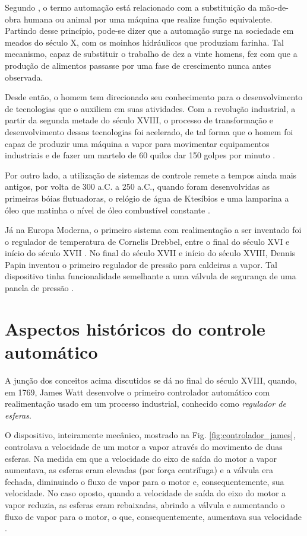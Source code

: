 \label{cap:introducao}

Segundo , o termo automação está relacionado com a
substituição da mão-de-obra humana ou animal por uma máquina que realize função
equivalente. Partindo desse princípio, pode-se dizer que a automação surge na
sociedade em meados do século X, com os moinhos hidráulicos que produziam
farinha. Tal mecanismo, capaz de substituir o trabalho de dez a vinte homens,
fez com que a produção de alimentos passasse por uma fase de crescimento nunca
antes observada.

Desde então, o homem tem direcionado seu conhecimento para o desenvolvimento de
tecnologias que o auxiliem em suas atividades. Com a revolução industrial, a
partir da segunda metade do século XVIII, o processo de transformação e
desenvolvimento dessas tecnologias foi acelerado, de tal forma que o homem foi
capaz de produzir uma máquina a vapor para movimentar equipamentos industriais e
de fazer um martelo de 60 quilos dar 150 golpes por minuto \cite{goeking:2010}.

Por outro lado, a utilização de sistemas de controle remete a tempos ainda mais
antigos, por volta de 300 a.C. a 250 a.C., quando foram desenvolvidas as
primeiras bóias flutuadoras, o relógio de água de Ktesíbios e uma lamparina a
óleo que matinha o nível de óleo combustível constante
\cite{mayr:1970,mayr:1971,mayr:1975}.

Já na Europa Moderna, o primeiro sistema com realimentação a ser inventado foi o
regulador de temperatura de Cornelis Drebbel, entre o final do século XVI e
início do século XVII \cite{mayr:1975}. No final do século XVII e início do
século XVIII, Dennis Papin inventou o primeiro regulador de pressão para
caldeiras a vapor. Tal dispositivo tinha funcionalidade semelhante a uma válvula
de segurança de uma panela de pressão \cite{dorf:2009}. 

\section{Aspectos históricos do controle automático}
A junção dos conceitos acima discutidos se dá no final do século XVIII, quando,
em 1769, James Watt desenvolve o primeiro controlador automático com
realimentação usado em um processo industrial, conhecido como {\it regulador de
esferas}.

O dispositivo, inteiramente mecânico, mostrado na Fig.
\ref{fig:controlador_james}, controlava a velocidade de um motor a vapor através
do movimento de duas esferas. Na medida em que a velocidade do eixo de saída do
motor a vapor aumentava, as esferas eram elevadas (por força centrífuga) e a
válvula era fechada, diminuindo o fluxo de vapor para o motor e,
consequentemente, sua velocidade. No caso oposto, quando a velocidade de saída
do eixo do motor a vapor reduzia, as esferas eram rebaixadas, abrindo a válvula
e aumentando o fluxo de vapor para o motor, o que, consequentemente, aumentava
sua velocidade \cite{mayr:1970,mayr:1975,dorf:2009}.

